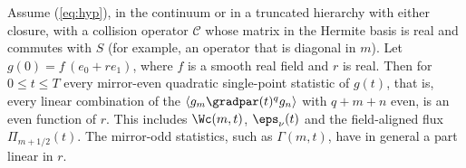 \begin{lemma}\label{lem:parity}
Assume (\ref{eq:hyp}), in the continuum or in a truncated hierarchy with either closure, with a collision operator $\mathcal C$ whose matrix in the Hermite basis is real and commutes with $S$ (for example, an operator that is diagonal in $m$). Let $g(0)=f\,(e_0+re_1)$, where $f$ is a smooth real field and $r$ is real. Then for $0\le t\le T$ every mirror-even quadratic single-point statistic of $g(t)$, that is, every linear combination of the $\langle g_m\gradpar(t)^qg_n\rangle$ with $q+m+n$ even, is an even function of $r$. This includes $\Wc(m,t)$, $\eps_\nu(t)$ and the field-aligned flux $\Pi_{m+1/2}(t)$. The mirror-odd statistics, such as $\Gamma(m,t)$, have in general a part linear in $r$.
\end{lemma}

